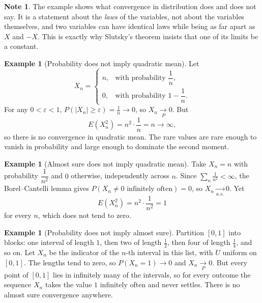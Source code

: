 \documentclass[11pt,a4paper]{article}
\theoremstyle{definition}
\newtheorem{exa}[thm]{Example}
\newtheorem*{note}{Note}
\begin{document}
\begin{note}
The example shows what convergence in distribution does and does not say. It is
a statement about the \emph{laws} of the variables, not about the variables
themselves, and two variables can have identical laws while being as far apart
as $X$ and $-X$. This is exactly why Slutsky's theorem insists that one of its
limits be a constant.
\end{note}

\begin{exa}[Probability does not imply quadratic mean]
Let
$$X_n = \begin{cases} n, & \text{with probability } \dfrac1n,\\[4pt]
0, & \text{with probability } 1-\dfrac1n.\end{cases}$$
For any $0<\varepsilon<1$, $P\left(\left|X_n\right|\geq\varepsilon\right)=\frac1n\rightarrow0$,
so $X_n\underset{P}{\longrightarrow}0$. But
$$E\left(X_n^{2}\right) = n^{2}\cdot\frac1n = n \longrightarrow \infty ,$$
so there is no convergence in quadratic mean. The rare values are rare enough to
vanish in probability and large enough to dominate the second moment.
\end{exa}

\begin{exa}[Almost sure does not imply quadratic mean]
Take $X_n = n$ with probability $\dfrac{1}{n^{2}}$ and $0$ otherwise,
independently across $n$. Since $\sum_n \frac{1}{n^{2}}<\infty$, the
Borel--Cantelli lemma gives $P\left(X_n\neq0 \text{ infinitely often}\right)=0$,
so $X_n\underset{a.s.}{\longrightarrow}0$. Yet
$$E\left(X_n^{2}\right) = n^{2}\cdot\frac{1}{n^{2}} = 1$$
for every $n$, which does not tend to zero.
\end{exa}

\begin{exa}[Probability does not imply almost sure]
Partition $[0,1]$ into blocks: one interval of length $1$, then two of length
$\tfrac12$, then four of length $\tfrac14$, and so on. Let $X_n$ be the
indicator of the $n$-th interval in this list, with $U$ uniform on $[0,1]$.
The lengths tend to zero, so $P\left(X_n=1\right)\rightarrow0$ and
$X_n\underset{P}{\longrightarrow}0$. But every point of $[0,1]$ lies in
infinitely many of the intervals, so for every outcome the sequence
$X_n$ takes the value $1$ infinitely often and never settles. There is no
almost sure convergence anywhere.
\end{exa}
\end{document}
